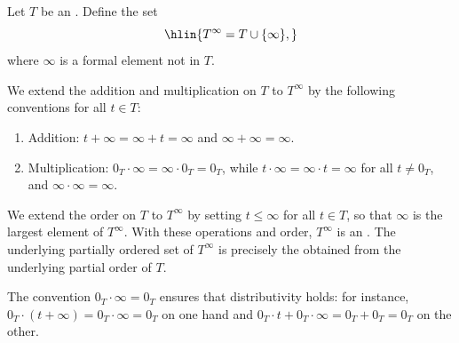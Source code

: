 \begin{definition} \label{definition:ordered_semiring_with_adjoined_infinity}
    Let $T$ be an . Define the set
    $$\hlin{T^\infty = T \cup \{\infty\},}$$
    where $\infty$ is a formal element not in $T$.

    We extend the addition and multiplication on $T$ to $T^\infty$ by the following conventions for all $t \in T$:
    \begin{enumerate}
        \item Addition: $t + \infty = \infty + t = \infty$ and $\infty + \infty = \infty$.
        \item Multiplication: $0_T \cdot \infty = \infty \cdot 0_T = 0_T$, while $t \cdot \infty = \infty \cdot t = \infty$ for all $t \neq 0_T$, and $\infty \cdot \infty = \infty$.
    \end{enumerate}

    We extend the order on $T$ to $T^\infty$ by setting $t \leq \infty$ for all $t \in T$, so that $\infty$ is the largest element of $T^\infty$. With these operations and order, $T^\infty$ is an . The underlying partially ordered set of $T^\infty$ is precisely the  obtained from the underlying partial order of $T$.


    The convention $0_T \cdot \infty = 0_T$ ensures that distributivity holds: for instance, $0_T \cdot (t + \infty) = 0_T \cdot \infty = 0_T$ on one hand and $0_T \cdot t + 0_T \cdot \infty = 0_T + 0_T = 0_T$ on the other.
\end{definition}
